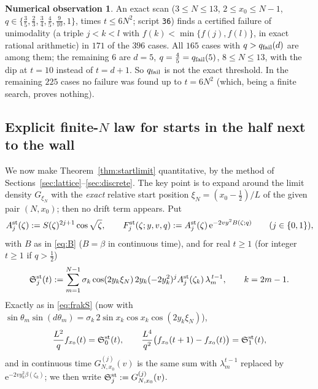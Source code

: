 \documentclass[11pt,a4paper]{article}
\theoremstyle{definition}
\newtheorem{observation}[theorem]{Numerical observation}
\theoremstyle{remark}
\newcommand{\ee}{\mathrm{e}}
\begin{document}
\begin{observation}\label{obs:startfail}
An exact scan ($3\le N\le13$, $2\le x_0\le N-1$, $q\in\{\frac35,\frac23,\frac34,\frac45,\frac9{10},1\}$, times
$t\le6N^2$; script \texttt{36}) finds a certified failure of unimodality (a triple $j<k<l$ with $f(k)<\min\{f(j),f(l)\}$,
in exact rational arithmetic) in $171$ of the $396$ cases. All $165$ cases with $q>q_{\rm fail}(d)$ are among them; the
remaining $6$ are $d=5$, $q=\frac45=q_{\rm fail}(5)$, $8\le N\le13$, with the dip at $t=10$ instead of $t=d+1$. So
$q_{\rm fail}$ is not the exact threshold. In the remaining $225$ cases no failure was found up to $t=6N^2$ (which, being a
finite search, proves nothing). %
\end{observation}

\subsection{Explicit finite-\texorpdfstring{$N$}{N} law for starts in the half next to the wall}

We now make Theorem~\ref{thm:startlimit} quantitative, by the method of
Sections~\ref{sec:lattice}--\ref{sec:discrete}. The key point is to expand around the limit density
$G_{\xi_N}$ with the \emph{exact} relative start position $\xi_N=(x_0-\frac12)/L$ of the given pair $(N,x_0)$; then no
drift term appears. Put
\[
   A^{\rm st}_j(\zeta):=S(\zeta)^{2j+1}\cos\sqrt\zeta ,\qquad
   F^{\rm st}_j(\zeta;y,v,q):=A^{\rm st}_j(\zeta)\,\ee^{-2vy^2B(\zeta;q)}\qquad(j\in\{0,1\}),
\]
with $B$ as in \eqref{eq:B} ($B=\beta$ in continuous time), and for real $t\ge1$ (for integer $t\ge1$ if $q>\frac12$)
\begin{equation}\label{eq:frakSst}
  \mathfrak S^{\rm st}_j(t):=\sum_{m=1}^{N-1}\sigma_k\cos(2y_k\xi_N)\,2y_k(-2y_k^2)^jA^{\rm st}_j(\zeta_k)\,\lambda_m^{\,t-1},\qquad k=2m-1 .
\end{equation}
Exactly as in \eqref{eq:frakS} (now with $\sin\theta_m\sin(d\theta_m)=\sigma_k\,2\sin x_k\cos x_k\cos(2y_k\xi_N)$),
\[
   \frac{L^2}qf_{x_0}(t)=\mathfrak S^{\rm st}_0(t),\qquad \frac{L^4}{q^2}\bigl(f_{x_0}(t+1)-f_{x_0}(t)\bigr)=\mathfrak S^{\rm st}_1(t),
\]
and in continuous time $G_{N,x_0}^{(j)}(v)$ is the same sum with $\lambda_m^{t-1}$ replaced by
$\ee^{-2vy_k^2\beta(\zeta_k)}$; we then write $\mathfrak S^{\rm st}_j:=G_{N,x_0}^{(j)}(v)$.
\end{document}
